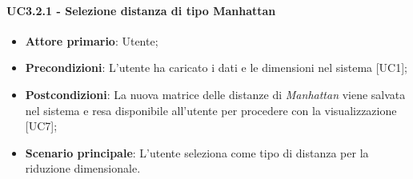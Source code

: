 \paragraph{UC3.2.1 - Selezione distanza di tipo Manhattan}
\begin{itemize}
	\item \textbf{Attore primario}: Utente;
	\item \textbf{Precondizioni}: L'utente ha caricato i dati e le dimensioni nel sistema [UC1];
	\item \textbf{Postcondizioni}: La nuova matrice delle distanze di \textit{Manhattan} viene salvata nel sistema e resa disponibile all'utente per procedere con la visualizzazione [UC7];
	\item \textbf{Scenario principale}: L'utente seleziona  come tipo di distanza per la riduzione dimensionale.
\end{itemize}